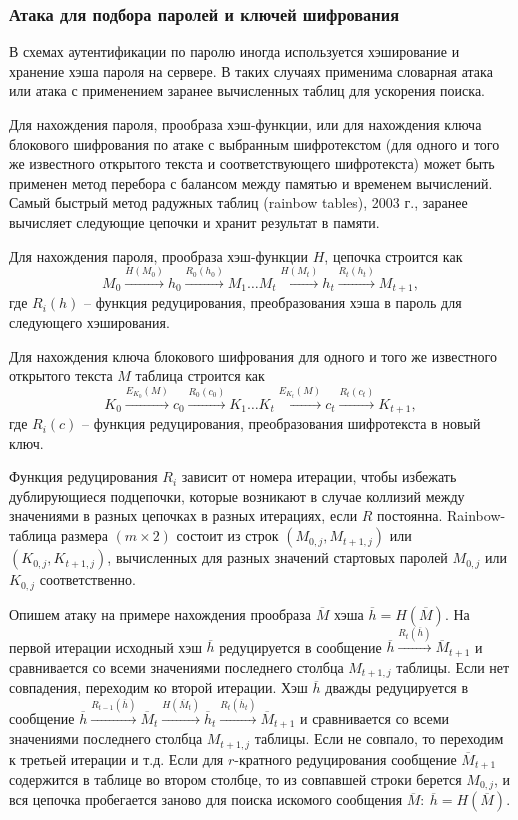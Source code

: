 \documentclass[10pt,a4paper]{book}
\begin{document}
\subsubsection{Атака для подбора паролей и ключей шифрования}

В схемах аутентификации по паролю иногда используется хэширование и хранение хэша пароля на сервере. В таких случаях применима словарная атака или атака с применением заранее вычисленных таблиц для ускорения поиска.

Для нахождения пароля, прообраза хэш-функции, или для нахождения ключа блокового шифрования по атаке с выбранным шифротекстом (для одного и того же известного открытого текста и соответствующего шифротекста) может быть применен метод перебора с балансом между памятью и временем вычислений. Самый быстрый метод радужных таблиц (rainbow tables), 2003 г., заранее вычисляет следующие цепочки и хранит результат в памяти.

Для нахождения пароля, прообраза хэш-функции $H$, цепочка строится как
    \[ M_0 \xrightarrow{H(M_0)} h_0 \xrightarrow{R_0(h_0)} M_1 \ldots M_t \xrightarrow{H(M_t)} h_t \xrightarrow{R_t(h_t)} M_{t+1}, \]
где $R_i(h)$ -- функция редуцирования, преобразования хэша в пароль для следующего хэширования.

Для нахождения ключа блокового шифрования для одного и того же известного открытого текста $M$ таблица строится как
    \[ K_0 \xrightarrow{E_{K_0}(M)} c_0 \xrightarrow{R_0(c_0)} K_1 \ldots K_t \xrightarrow{E_{K_t}(M)} c_t \xrightarrow{R_t(c_t)} K_{t+1}, \]
где $R_i(c)$ -- функция редуцирования, преобразования шифротекста в новый ключ.

Функция редуцирования $R_i$ зависит от номера итерации, чтобы избежать дублирующиеся подцепочки, которые возникают в случае коллизий между значениями в разных цепочках в разных итерациях, если $R$ постоянна. Rainbow-таблица размера $(m \times 2)$ состоит из строк $(M_{0,j}, M_{t+1,j})$ или $(K_{0,j}, K_{t+1,j})$, вычисленных для разных значений стартовых паролей $M_{0,j}$ или $K_{0,j}$ соответственно.

Опишем атаку на примере нахождения прообраза $\overline{M}$ хэша $\overline{h} = H(\overline{M})$. На первой итерации исходный хэш $\overline{h}$ редуцируется в сообщение $\overline{h} \xrightarrow{R_t(\overline{h})} \overline{M}_{t+1} $ и сравнивается со всеми значениями последнего столбца $M_{t+1,j}$ таблицы. Если нет совпадения, переходим ко второй итерации. Хэш $\overline{h}$ дважды редуцируется в сообщение $\overline{h} \xrightarrow{R_{t-1}(\overline{h})} \overline{M}_t \xrightarrow{H(\overline{M}_t)} \overline{h}_t \xrightarrow{R_t(\overline{h}_t)} \overline{M}_{t+1}$ и сравнивается со всеми значениями последнего столбца $M_{t+1,j}$ таблицы. Если не совпало, то переходим к третьей итерации и т.д. Если для $r$-кратного редуцирования сообщение $\overline{M}_{t+1}$ содержится в таблице во втором столбце, то из совпавшей строки берется $M_{0,j}$, и вся цепочка пробегается  заново для поиска искомого сообщения $\overline{M}: ~ \overline{h} = H(\overline{M})$.
\end{document}
